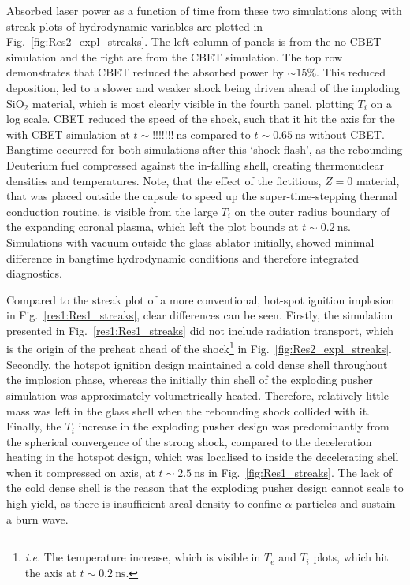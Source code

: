 Absorbed laser power as a function of time from these two simulations along with streak plots of hydrodynamic variables are plotted in Fig.~\ref{fig:Res2_expl_streaks}.
The left column of panels is from the no-\ac{CBET} simulation and the right are from the \ac{CBET} simulation.
The top row demonstrates that \ac{CBET} reduced the absorbed power by $\sim15\%$.
This reduced deposition, led to a slower and weaker shock being driven ahead of the imploding $\text{SiO}_2$ material, which is most clearly visible in the fourth panel, plotting $T_i$ on a log scale.
\ac{CBET} reduced the speed of the shock, such that it hit the axis for the with-\ac{CBET} simulation at $t\sim!!!!!!!\ \text{ns}$ compared to $t\sim0.65\ \text{ns}$ without \ac{CBET}.
Bangtime occurred for both simulations after this `shock-flash', as the rebounding Deuterium fuel compressed against the in-falling shell, creating thermonuclear densities and temperatures.
Note, that the effect of the fictitious, $Z=0$ material, that was placed outside the capsule to speed up the super-time-stepping thermal conduction routine, is visible from the large $T_i$ on the outer radius boundary of the expanding coronal plasma, which left the plot bounds at $t\sim0.2\ \text{ns}$.
Simulations with vacuum outside the glass ablator initially, showed minimal difference in bangtime hydrodynamic conditions and therefore integrated diagnostics.

Compared to the streak plot of a more conventional, hot-spot ignition implosion in Fig.~\ref{res1:Res1_streaks}, clear differences can be seen.
Firstly, the simulation presented in Fig.~\ref{res1:Res1_streaks} did not include radiation transport, which is the origin of the preheat ahead of the shock\footnote{\textit{i.e.} The temperature increase, which is visible in $T_e$ and $T_i$ plots, which hit the axis at $t\sim0.2\ \text{ns}$.} in Fig.~\ref{fig:Res2_expl_streaks}.
Secondly, the hotspot ignition design maintained a cold dense shell throughout the implosion phase, whereas the initially thin shell of the exploding pusher simulation was approximately volumetrically heated.
Therefore, relatively little mass was left in the glass shell when the rebounding shock collided with it.
Finally, the $T_i$ increase in the exploding pusher design was predominantly from the spherical convergence of the strong shock, compared to the deceleration heating in the hotspot design, which was localised to inside the decelerating shell when it compressed on axis, at $t\sim2.5\ \text{ns}$ in Fig.~\ref{fig:Res1_streaks}.
The lack of the cold dense shell is the reason that the exploding pusher design cannot scale to high yield, as there is insufficient areal density to confine $\alpha$ particles and sustain a burn wave.

